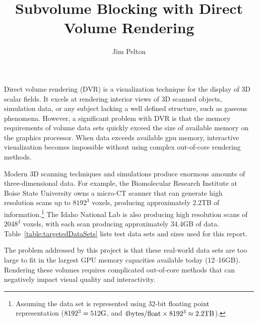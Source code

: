\documentclass[journal]{vgtc}                %
\title{Subvolume Blocking with Direct Volume Rendering}
\author{Jim Pelton}
\begin{document}


\maketitle

Direct volume rendering (DVR) is a visualization technique for the display of
3D scalar fields. It excels at rendering interior views of 3D scanned
objects, simulation data, or any subject lacking a well defined structure, such
as gaseous phenomena. However, a significant problem with DVR is that the
memory requirements of volume data sets quickly exceed the size of available
memory on the graphics processor.  When data exceeds available gpu memory, 
interactive visualization becomes impossible without using complex out-of-core 
rendering methods. 

Modern 3D scanning techniques and simulations produce enormous amounts of
three-dimensional data.  For example, the Biomolecular Research Institute at
Boise State University owns a micro-CT scanner that can generate high
resolution scans up to $8192^3$ voxels, producing approximately 2.2TB of
information.\footnote{Assuming the data set is represented using 32-bit
	floating point representation 
	($8192^3 = 512\textnormal{G}$, 
	and $4\textnormal{bytes/float} \times 8192^3 \approx 2.2\textnormal{TB}$).} 
The Idaho National Lab is also producing high resolution scans of $2048^3$
voxels, with each scan producing approximately 34.4GB of data.
Table~\ref{table:targetedDataSets} lists test data sets and sizes used for this
report.

The problem addressed by this project is that these real-world data sets are
too large to fit in the largest GPU memory capacities available today
(12--16GB).  Rendering these volumes requires complicated out-of-core methods that can
negatively impact visual quality and interactivity.  
\end{document}
